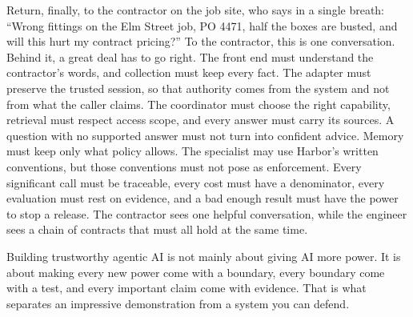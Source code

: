 Return, finally, to the contractor on the job site, who says in a single breath: ``Wrong fittings on the Elm Street job, PO 4471, half the boxes are busted, and will this hurt my contract pricing?'' To the contractor, this is one conversation. Behind it, a great deal has to go right. The front end must understand the contractor's words, and collection must keep every fact. The adapter must preserve the trusted session, so that authority comes from the system and not from what the caller claims. The coordinator must choose the right capability, retrieval must respect access scope, and every answer must carry its sources. A question with no supported answer must not turn into confident advice. Memory must keep only what policy allows. The specialist may use Harbor's written conventions, but those conventions must not pose as enforcement. Every significant call must be traceable, every cost must have a denominator, every evaluation must rest on evidence, and a bad enough result must have the power to stop a release. The contractor sees one helpful conversation, while the engineer sees a chain of contracts that must all hold at the same time.

\begin{principle}
Building trustworthy agentic AI is not mainly about giving AI more power. It is about making every new power come with a boundary, every boundary come with a test, and every important claim come with evidence. That is what separates an impressive demonstration from a system you can defend.
\end{principle}
